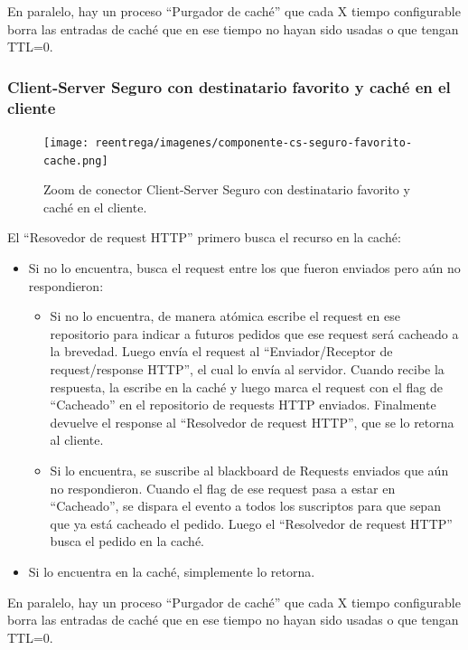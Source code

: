 En paralelo, hay un proceso ``Purgador de caché'' que cada X tiempo configurable borra las entradas
de caché que en ese tiempo no hayan sido usadas o que tengan TTL=0.


\subsubsection{Client-Server Seguro con destinatario favorito y caché en el cliente}

\begin{figure}[H]
   \centering
   \texttt{[image: reentrega/imagenes/componente-cs-seguro-favorito-cache.png]}
   \caption{Zoom de conector Client-Server Seguro con destinatario favorito y caché en el cliente.}
\end{figure}


El ``Resovedor de request HTTP'' primero busca el recurso en la caché:
\begin{itemize}
	\item Si no lo encuentra, busca el request entre los que fueron enviados pero aún no respondieron:
	\begin{itemize}
		\item Si no lo encuentra, de manera atómica escribe el request en ese repositorio para indicar a futuros
        pedidos que ese request será cacheado a la brevedad. Luego envía el request al ``Enviador/Receptor de
        request/response HTTP'', el cual lo envía al servidor. Cuando recibe la respuesta, la escribe en la caché
        y luego marca el request con el flag de ``Cacheado'' en el repositorio de requests HTTP enviados. Finalmente
        devuelve el response al ``Resolvedor de request HTTP'', que se lo retorna al cliente.
        
        \item Si lo encuentra, se suscribe al blackboard de Requests enviados que aún no respondieron.
        Cuando el flag de ese request pasa a estar en ``Cacheado'', se dispara el evento
        a todos los suscriptos para que sepan que ya está cacheado el pedido. Luego el ``Resolvedor de
        request HTTP'' busca el pedido en la caché.
	\end{itemize}
	
	\item  Si lo encuentra en la caché, simplemente lo retorna.
\end{itemize}

En paralelo, hay un proceso ``Purgador de caché'' que cada X tiempo configurable borra las entradas
de caché que en ese tiempo no hayan sido usadas o que tengan TTL=0.